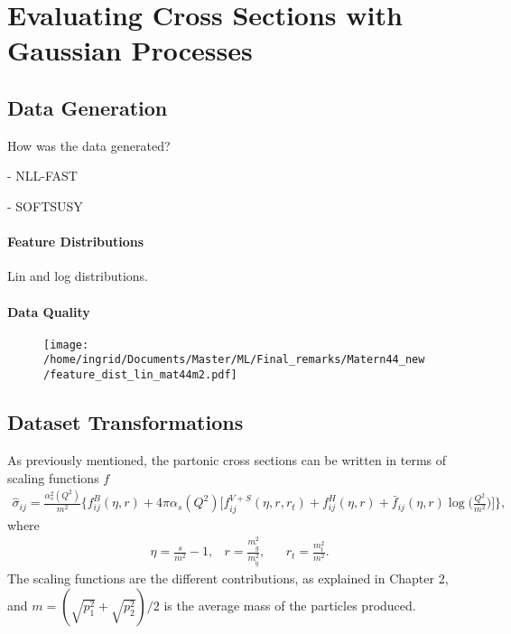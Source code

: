 \documentclass[twoside,english]{uiofysmaster}
\begin{document}
\tableofcontents










\chapter{Evaluating Cross Sections with Gaussian Processes}

\section{Data Generation}

How was the data generated?

- NLL-FAST

- SOFTSUSY

\subsubsection{Feature Distributions}

Lin and log distributions. 

\subsubsection{Data Quality}

\begin{figure}
\centering
\texttt{[image: /home/ingrid/Documents/Master/ML/Final\_remarks/Matern44\_new/feature\_dist\_lin\_mat44m2.pdf]}
\end{figure}

\section{Dataset Transformations}

As previously mentioned, the partonic cross sections can be written in terms of scaling functions $f$
\begin{align*}
\hat{\sigma}_{ij} = \frac{\alpha^2_s (Q^2)}{m^2} \Bigg\{ f^B_{ij}(\eta, r) + 4 \pi \alpha_s (Q^2) \Bigg[ f^{V+S}_{ij}(\eta, r, r_t) + f^H_{ij}(\eta, r) + \bar{f}_{ij} (\eta, r) \log \Big( \frac{Q^2}{m^2} \Big) \Bigg] \Bigg\},
\end{align*}
where 
\begin{align*}
&\eta = \frac{s}{m^2} - 1, &r = \frac{m_{\tilde{g}}^2}{m_{\tilde{q}}^2}, &&r_t = \frac{m_t^2}{m^2}.
\end{align*}
The scaling functions are the different contributions, as explained in Chapter 2, and $m = (\sqrt{p_1^2} + \sqrt{p_2^2} )/2$ is the average mass of the particles produced.
\end{document}

